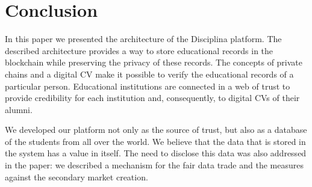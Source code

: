 \section{Conclusion}
In this paper we presented the architecture of the Disciplina platform. The
described architecture provides a way to store educational records in the
blockchain while preserving the privacy of these records. The concepts of
private chains and a digital CV make it possible to verify the educational
records of a particular person. Educational institutions are connected in a web
of trust to provide credibility for each institution and, consequently, to
digital CVs of their alumni.

We developed our platform not only as the source of trust, but also as a
database of the students from all over the world. We believe that the data that
is stored in the system has a value in itself. The need to disclose this data
was also addressed in the paper: we described a mechanism for the fair data
trade and the measures against the secondary market creation.
